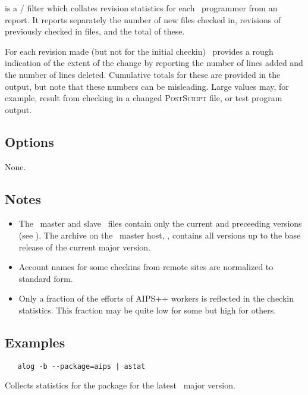  is a / filter which collates revision
statistics for each \aipspp\ programmer from an  report.  It
reports separately the number of new files checked in, revisions of previously
checked in files, and the total of these.

For each revision made (but not for the initial checkin) \rcs\ provides a
rough indication of the extent of the change by reporting the number of lines
added and the number of lines deleted.  Cumulative totals for these are
provided in the output, but note that these numbers can be misleading.  Large
values may, for example, result from checking in a changed \textsc{PostScript}
file, or test program output.
 
\subsection*{Options}
 
None.
 
\subsection*{Notes}
 
\begin{itemize}
\item
   The \aipspp\ master and slave \rcs\ files contain only the current and
   preceeding versions (see ).  The archive on the \aipspp\
   master host, ,  contains all versions up to the base
   release of the current major version.

\item
   Account names for some checkins from remote sites are normalized to
   standard form.

\item
   Only a fraction of the efforts of AIPS++ workers is reflected in the
   checkin statistics.  This fraction may be quite low for some but high for
   others.
\end{itemize}

\subsection*{Examples}

\begin{verbatim}
   alog -b --package=aips | astat
\end{verbatim}

\noindent
Collects statistics for the  package for the latest \aipspp\ major
version.
 
